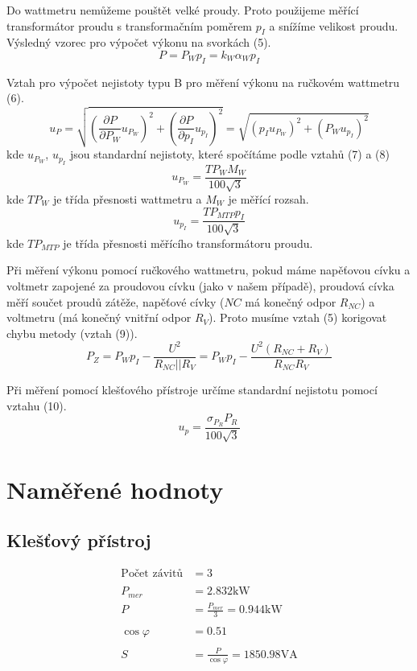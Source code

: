 \documentclass{article}
\begin{document}
Do wattmetru nemůžeme pouštět velké proudy. Proto použijeme měřící transformátor proudu s transformačním poměrem $p_I$ a snížíme velikost proudu. Výsledný vzorec pro výpočet výkonu na svorkách (5).
\begin{equation}
	P=P_W p_I=k_W \alpha_W p_I
\end{equation}

Vztah pro výpočet nejistoty typu B pro měření výkonu na ručkovém wattmetru (6).
\begin{equation}
	u_P=\sqrt{(\frac{\partial P}{\partial P_W}u_{P_W})^2+(\frac{\partial P}{\partial p_I}u_{p_I})^2}=\sqrt{(p_Iu_{P_W})^2+(P_Wu_{p_I})^2}
\end{equation}
kde $u_{P_W}$, $u_{p_I}$ jsou standardní nejistoty, které spočítáme podle vztahů (7) a (8)
\begin{equation}
	u_{P_W} = \frac{{TP}_WM_W}{100\sqrt{3}}
\end{equation}
kde ${TP}_W$ je třída přesnosti wattmetru a $M_W$ je měřící rozsah.
\begin{equation}
	u_{p_I} = \frac{{TP}_{MTP}p_I}{100\sqrt{3}}
\end{equation}
kde ${TP}_{MTP}$ je třída přesnosti měřícího transformátoru proudu.

Při měření výkonu pomocí ručkového wattmetru, pokud máme napěťovou cívku a voltmetr zapojené za proudovou cívku (jako v našem případě), proudová cívka měří součet proudů zátěže, napěťové cívky ($NC$ má konečný odpor $R_{NC}$) a voltmetru (má konečný vnitřní odpor $R_V$). Proto musíme vztah (5) korigovat chybu metody (vztah (9)).
\begin{equation}
	P_Z=P_Wp_I-\frac{U^2}{R_{NC}||R_V}=P_Wp_I-\frac{U^2(R_{NC}+R_V)}{R_{NC}R_V}
\end{equation}

Při měření pomocí klešťového přístroje určíme standardní nejistotu pomocí vztahu (10).
\begin{equation}
	u_{p} = \frac{\sigma_{P_R} P_R}{100\sqrt{3}}
\end{equation}
\section{Naměřené hodnoty}
\subsection{Klešťový přístroj}
$$
\begin{aligned}
	\text{Počet závitů} &= 3\\
	\\
	P_{mer} &= 2.832 \si{\kilo\watt}\\
	P &= \frac{P_{mer}}{3} = 0.944 \si{\kilo\watt}\\
	\\
	\cos{\varphi} &= 0.51\\
	\\
	S &= \frac{P}{\cos{\varphi}} = 1850.98\si{\volt\ampere}
\end{aligned}
$$
\end{document}
